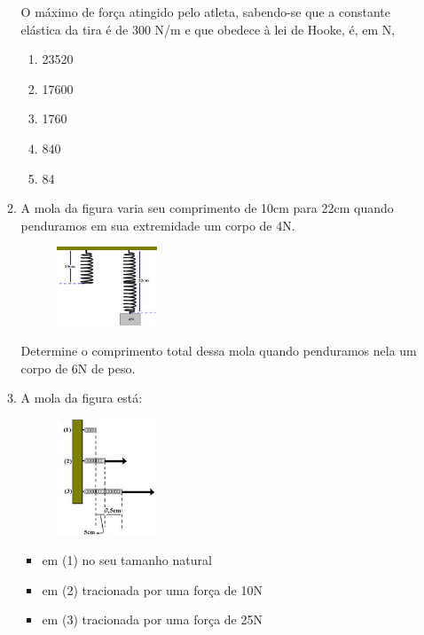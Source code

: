 \documentclass[12pt,letterpaper,fleqn]{article}
\begin{document}
\begin{itemize}
\begin{enumerate}
        O máximo de força atingido pelo atleta, sabendo-se que a constante elástica da tira é de 300 N/m e que obedece à lei de Hooke, é, em N,
        \begin{enumerate}
            \item 23520
            \item 17600
            \item 1760
            \item 840
            \item 84
        \end{enumerate}
        
        \item A mola da figura varia seu comprimento de 10cm para 22cm quando penduramos em sua extremidade um corpo de 4N.
        \begin{figure}[H]
            \centering
            \includegraphics[width=0.3\textwidth]{ex_3.jpg}
        \end{figure}
        Determine o comprimento total dessa mola quando penduramos nela um corpo de 6N de peso.
        
        \item A mola da figura está:
        \begin{figure}[h]
            \centering
            \includegraphics[width=0.3\textwidth]{ex_4.jpg}
        \end{figure}
        \begin{itemize}
            \item em (1) no seu tamanho natural
            \item em (2) tracionada por uma força de 10N
            \item em (3) tracionada por uma força de 25N
        \end{itemize}
        

\end{enumerate}
\end{itemize}
\end{document}
